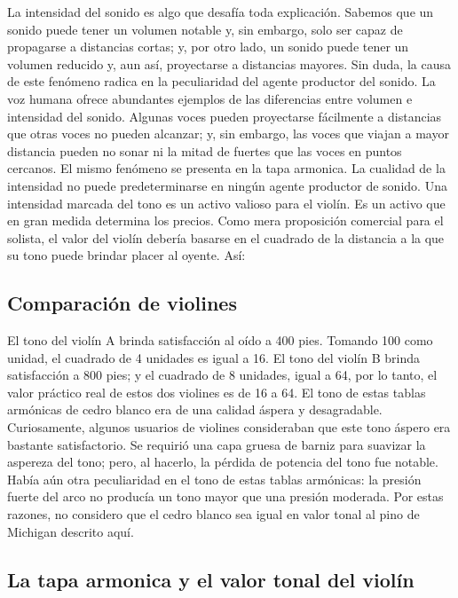 \documentclass[12pt]{book}
\begin{document}
La intensidad del sonido es algo que desafía toda explicación. Sabemos que un sonido puede tener un volumen notable y, sin embargo, solo ser capaz de propagarse a distancias cortas; y, por otro lado, un sonido puede tener un volumen reducido y, aun así, proyectarse a distancias mayores. Sin duda, la causa de este fenómeno radica en la peculiaridad del agente productor del sonido. La voz humana ofrece abundantes ejemplos de las diferencias entre volumen e intensidad del sonido. Algunas voces pueden proyectarse fácilmente a distancias que otras voces no pueden alcanzar; y, sin embargo, las voces que viajan a mayor distancia pueden no sonar ni la mitad de fuertes que las voces en puntos cercanos. El mismo fenómeno se presenta en la tapa armonica. La cualidad de la intensidad no puede predeterminarse en ningún agente productor de sonido. Una intensidad marcada del tono es un activo valioso para el violín. Es un activo que en gran medida determina los precios. Como mera proposición comercial para el solista, el valor del violín debería basarse en el cuadrado de la distancia a la que su tono puede brindar placer al oyente. Así:

\subsection*{Comparación de violines}

El tono del violín A brinda satisfacción al oído a 400 pies. Tomando 100 como unidad, el cuadrado de 4 unidades es igual a 16. El tono del violín B brinda satisfacción a 800 pies; y el cuadrado de 8 unidades, igual a 64, por lo tanto, el valor práctico real de estos dos violines es de 16 a 64. El tono de estas tablas armónicas de cedro blanco era de una calidad áspera y desagradable. Curiosamente, algunos usuarios de violines consideraban que este tono áspero era bastante satisfactorio. Se requirió una capa gruesa de barniz para suavizar la aspereza del tono; pero, al hacerlo, la pérdida de potencia del tono fue notable. Había aún otra peculiaridad en el tono de estas tablas armónicas: la presión fuerte del arco no producía un tono mayor que una presión moderada. Por estas razones, no considero que el cedro blanco sea igual en valor tonal al pino de Michigan descrito aquí.

\subsection*{La tapa armonica y el valor tonal del violín}
\end{document}
